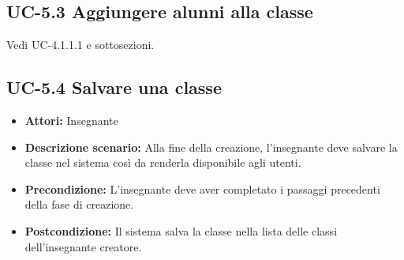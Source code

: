 \subsection{UC-5.3 Aggiungere alunni alla classe}
Vedi UC-4.1.1.1 e sottosezioni.
\subsection{UC-5.4 Salvare una classe}
\begin{itemize}
	\item \textbf{Attori:} Insegnante
	\item \textbf{Descrizione scenario:} Alla fine della creazione, l'insegnante deve salvare la classe nel sistema così da renderla disponibile agli utenti.
	\item \textbf{Precondizione:} L'insegnante deve aver completato i passaggi precedenti della fase di creazione.
	\item \textbf{Postcondizione:} Il sistema salva la classe nella lista delle classi dell'insegnante creatore.
\end{itemize}

